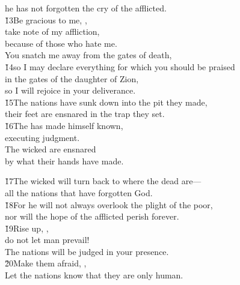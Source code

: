 \begin{poetry}
\poemll    he has not forgotten the cry of the afflicted. \\
\poeml \v{13}Be gracious to me, , \\
\poemll    take note of my affliction, \\
\poemlll       because of those who hate me. \\
\poeml You snatch me away from the gates of death, \\
\poeml \v{14}so I may declare everything for which you should be praised \\
\poeml in the gates of the daughter of Zion, \\
\poemll    so I will rejoice in your deliverance. \\
\poeml \v{15}The nations have sunk down into the pit they made, \\
\poemll    their feet are ensnared in the trap they set. \\
\poeml \v{16}The  has made himself known, \\
\poemll    executing judgment. \\
\poeml The wicked are ensnared \\
\poemll    by what their hands have made.
\end{poetry}

\begin{poetry}
\poeml \v{17}The wicked will turn back to where the dead are--- \\
\poemll    all the nations that have forgotten God. \\
\poeml \v{18}For he will not always overlook the plight of the poor, \\
\poemll    nor will the hope of the afflicted perish forever. \\
\poeml \v{19}Rise up, , \\
\poemll    do not let man prevail! \\
\poemlll       The nations will be judged in your presence. \\
\poeml \v{20}Make them afraid, , \\
\poemll    Let the nations know that they are only human.
\end{poetry}


